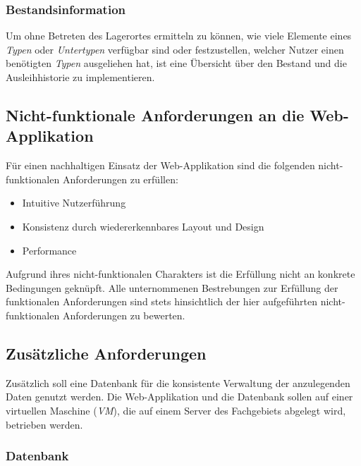 \documentclass[
]{article}
\providecommand{\tightlist}{%
  \setlength{\itemsep}{0pt}\setlength{\parskip}{0pt}}
\begin{document}
\hypertarget{bestandsinformation}{%
\subsubsection{Bestandsinformation}\label{bestandsinformation}}

Um ohne Betreten des Lagerortes ermitteln zu können, wie viele Elemente eines \emph{Typen} oder \emph{Untertypen} verfügbar sind oder festzustellen, welcher Nutzer einen benötigten \emph{Typen} ausgeliehen hat, ist eine Übersicht über den Bestand und die Ausleihhistorie zu implementieren.

\hypertarget{nicht-funktionale-anforderungen-an-die-web-applikation}{%
\subsection{Nicht-funktionale Anforderungen an die Web-Applikation}\label{nicht-funktionale-anforderungen-an-die-web-applikation}}

Für einen nachhaltigen Einsatz der Web-Applikation sind die folgenden nicht-funktionalen Anforderungen zu erfüllen:

\begin{itemize}
\tightlist
\item
  Intuitive Nutzerführung
\item
  Konsistenz durch wiedererkennbares Layout und Design
\item
  Performance
\end{itemize}

Aufgrund ihres nicht-funktionalen Charakters ist die Erfüllung nicht an konkrete Bedingungen geknüpft. Alle unternommenen Bestrebungen zur Erfüllung der funktionalen Anforderungen sind stets hinsichtlich der hier aufgeführten nicht-funktionalen Anforderungen zu bewerten.

\hypertarget{zusuxe4tzliche-anforderungen}{%
\subsection{Zusätzliche Anforderungen}\label{zusuxe4tzliche-anforderungen}}

Zusätzlich soll eine Datenbank für die konsistente Verwaltung der anzulegenden Daten genutzt werden. Die Web-Applikation und die Datenbank sollen auf einer virtuellen Maschine (\emph{VM}), die auf einem Server des Fachgebiets abgelegt wird, betrieben werden.

\hypertarget{datenbank}{%
\subsubsection{Datenbank}\label{datenbank}}
\end{document}
